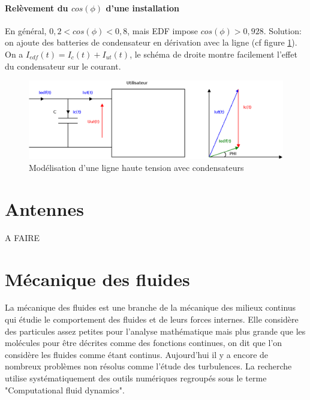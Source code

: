 \documentclass[10pt,a4paper]{article}
\begin{document}
\paragraph{Relèvement du $cos(\phi)$ d'une installation}
En général, $0,2 < cos(\phi) < 0,8$, mais EDF impose $cos(\phi) > 0,928$. Solution: on ajoute des batteries de condensateur en dérivation avec la ligne (cf figure \ref{fig:ligne_condo}).
On a $I_{edf}(t) = I_{c}(t) + I_{ut}(t)$, le schéma de droite montre facilement l'effet du condensateur sur le courant.
\begin{figure}
\centering
\includegraphics[scale=0.20]{ligne_condo}
\caption{Modélisation d'une ligne haute tension avec condensateurs}
\label{fig:ligne_condo}
\end{figure}

\section{Antennes}
A FAIRE



\section{Mécanique des fluides}
La mécanique des fluides est une branche de la mécanique des milieux continus qui étudie le comportement des fluides et de leurs forces internes. Elle considère des particules assez petites pour l'analyse mathématique mais plus grande que les molécules pour être décrites comme des fonctions continues, on dit que l'on considère les fluides comme étant continus. Aujourd'hui il y a encore de nombreux problèmes non résolus comme l'étude des turbulences. La recherche utilise systématiquement des outils numériques regroupés sous le terme "Computational fluid dynamics".
\end{document}
